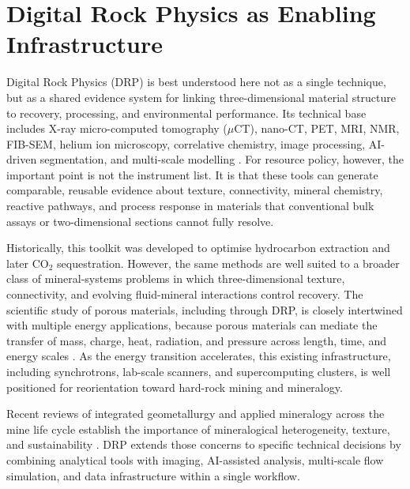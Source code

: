 \documentclass[12pt,a4paper]{article}
\begin{document}
\section{Digital Rock Physics as Enabling Infrastructure}
Digital Rock Physics (DRP) is best understood here not as a single technique, but as a shared evidence system for linking three-dimensional material structure to recovery, processing, and environmental performance. Its technical base includes X-ray micro-computed tomography ($\mu$CT), nano-CT, PET, MRI, NMR, FIB-SEM, helium ion microscopy, correlative chemistry, image processing, AI-driven segmentation, and multi-scale modelling \cite{drp_blunt_2013}. For resource policy, however, the important point is not the instrument list. It is that these tools can generate comparable, reusable evidence about texture, connectivity, mineral chemistry, reactive pathways, and process response in materials that conventional bulk assays or two-dimensional sections cannot fully resolve.

Historically, this toolkit was developed to optimise hydrocarbon extraction and later CO$_2$ sequestration. However, the same methods are well suited to a broader class of mineral-systems problems in which three-dimensional texture, connectivity, and evolving fluid-mineral interactions control recovery. The scientific study of porous materials, including through DRP, is closely intertwined with multiple energy applications, because porous materials can mediate the transfer of mass, charge, heat, radiation, and pressure across length, time, and energy scales \cite{farber_science_2025}. As the energy transition accelerates, this existing infrastructure, including synchrotrons, lab-scale scanners, and supercomputing clusters, is well positioned for reorientation toward hard-rock mining and mineralogy.

Recent reviews of integrated geometallurgy and applied mineralogy across the mine life cycle establish the importance of mineralogical heterogeneity, texture, and sustainability \cite{lishchuk_integrated_2020, becker_applied_2023}. DRP extends those concerns to specific technical decisions by combining analytical tools with imaging, AI-assisted analysis, multi-scale flow simulation, and data infrastructure within a single workflow.
\end{document}
